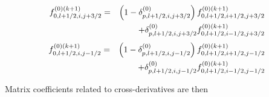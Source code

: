 \begin{eqnarray}
f_{0,l+1/2,i,j+3/2}^{\left( 0\right) (k+1)} &=&\left( 1-\delta
_{p,l+1/2,i,j+3/2}^{\left( 0\right) }\right) f_{0,l+1/2,i+1/2,j+3/2}^{\left(
0\right) (k+1)}  \notag \\
&&+\delta _{p,l+1/2,i,j+3/2}^{\left( 0\right)
}f_{0,l+1/2,i-1/2,j+3/2}^{\left( 0\right) (k+1)}
\end{eqnarray}%
\begin{eqnarray}
f_{0,l+1/2,i,j-1/2}^{\left( 0\right) (k+1)} &=&\left( 1-\delta
_{p,l+1/2,i,j-1/2}^{\left( 0\right) }\right) f_{0,l+1/2,i+1/2,j-1/2}^{\left(
0\right) (k+1)}  \notag \\
&&+\delta _{p,l+1/2,i,j-1/2}^{\left( 0\right)
}f_{0,l+1/2,i-1/2,j-1/2}^{\left( 0\right) (k+1)}
\end{eqnarray}

Matrix coefficients related to cross-derivatives are then

